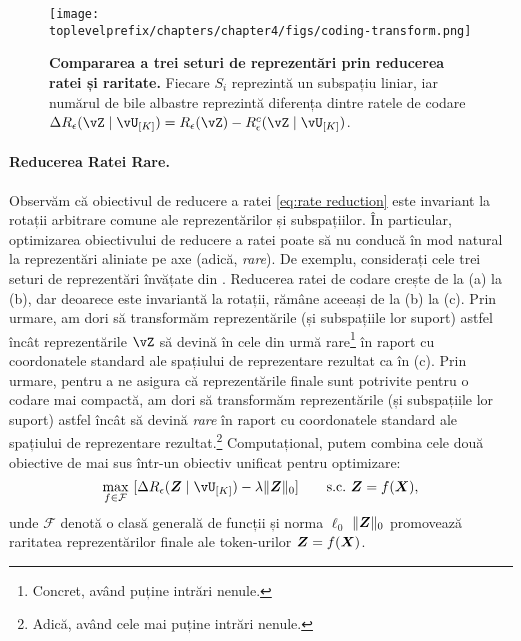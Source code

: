 \documentclass[../../book-main_ro.tex]{subfiles}
\begin{document}
\begin{figure}[t]
    \centering
        \texttt{[image: \\toplevelprefix/chapters/chapter4/figs/coding-transform.png]}
    \caption{\small\textbf{Compararea a trei seturi de reprezentări prin reducerea ratei și raritate.} Fiecare $S_i$ reprezintă un subspațiu liniar, iar numărul de bile albastre reprezintă diferența dintre ratele de codare $\Delta R_{\epsilon}(\vZ \mid \vU_{[K]}) = R_\epsilon(\vZ) - R^c_\epsilon(\vZ \mid \vU_{[K]})$.}
    \label{fig:sparse-rate-reduction-diagram}
\end{figure}

\paragraph{Reducerea Ratei Rare.} Observăm că obiectivul de reducere a ratei \eqref{eq:rate reduction} este invariant la rotații arbitrare comune ale reprezentărilor și subspațiilor. În particular, optimizarea obiectivului de reducere a ratei poate să nu conducă în mod natural la reprezentări aliniate pe axe (adică, \textit{rare}). {De exemplu, considerați cele trei seturi de reprezentări învățate din . Reducerea ratei de codare crește de la (a) la (b), dar deoarece este invariantă la rotații, rămâne aceeași de la (b) la (c).} Prin urmare, am dori să transformăm reprezentările (și subspațiile lor suport) astfel încât reprezentările $\vZ$ să devină în cele din urmă rare\footnote{Concret, având puține intrări nenule.} în raport cu coordonatele standard ale spațiului de reprezentare rezultat {ca în (c)}. Prin urmare, pentru a ne asigura că reprezentările finale sunt potrivite pentru o codare mai compactă, am dori să transformăm reprezentările (și subspațiile lor suport) astfel încât să devină \textit{rare} în raport cu coordonatele standard ale spațiului de reprezentare rezultat.\footnote{Adică, având cele mai puține intrări nenule.} Computațional, putem combina cele două obiective de mai sus într-un obiectiv unificat pentru optimizare:
\begin{equation}
   \max_{f \in \mathcal{F}}\ [\Delta R_{\epsilon}(\Z \mid \vU_{[K]}) - \lambda \|\bm{Z}\|_0] \qquad \text{s.c.}\ \Z = f(\X),
   \label{eq:sparse-rr}
\end{equation}
unde $\mathcal{F}$ denotă o clasă generală de funcții și norma $\ell_0$ $\|\bm{Z}\|_0$ promovează raritatea reprezentărilor finale ale token-urilor \(\bm{Z} = f(\bm{X})\).%
\end{document}
